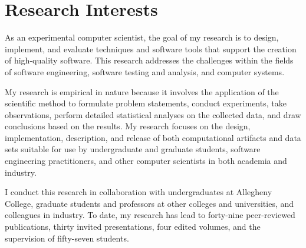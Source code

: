 \documentclass[11pt,letterpaper,sans]{moderncv/moderncv}
\begin{document}
\vspace*{-.05in}
\section{Research Interests}

{\small As an experimental computer scientist, the goal of my research is to design, implement, and evaluate
  techniques and software tools that support the creation of high-quality software.  This research addresses the
challenges within the fields of software engineering, software testing and analysis, and computer systems.}
\vspace*{.05in}

{\small My research is empirical in nature because it involves the application of the scientific method to formulate
  problem statements, conduct experiments, take observations, perform detailed statistical analyses on the collected
  data, and draw conclusions based on the results.  My research focuses on the design, implementation, description, and
  release of both computational artifacts and data sets suitable for use by undergraduate and graduate students,
software engineering practitioners, and other computer scientists in both academia and industry.}
\vspace*{.05in}

{\small I conduct this research in collaboration with undergraduates at Allegheny College, graduate students and
professors at other colleges and universities, and colleagues in industry. To date, my research has lead to forty-nine
peer-reviewed publications, thirty invited presentations, four edited volumes, and the supervision of fifty-seven
students.}



\nocite{*}

\setlength\bibitemsep{-.15in}

\renewcommand*{\bibfont}{\small}

\end{document}
